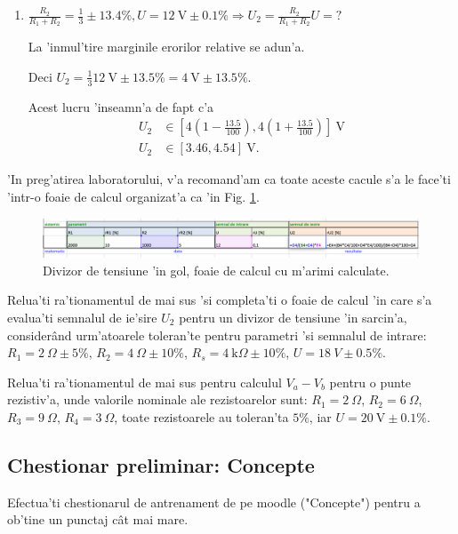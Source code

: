\begin{example}[]
\begin{enumerate}
\item \textcolor{Bittersweet}{$\frac{R_2}{R_1+R_2} = \frac{1}{3} \pm 13.4\%, U=12~\mathrm{V}\pm0.1\% \Longrightarrow U_2 = \frac{R_2}{R_1+R_2}U=?$}

La 'inmul'tire marginile erorilor relative se adun'a.

Deci $U_2 = \frac{1}{3}12~\mathrm{V} \pm 13.5\% = 4~\mathrm{V} \pm 13.5\%$.

Acest lucru 'inseamn'a de fapt c'a 
\begin{align*}
U_2 &\in \left[4\left(1-\frac{13.5}{100}\right), 4\left(1+\frac{13.5}{100}\right)\right]~\mathrm{V} \\
U_2 &\in \left[3.46, 4.54\right]~\mathrm{V}.
\end{align*}
\end{enumerate}
\end{example}

'In preg'atirea laboratorului, v'a recomand'am ca toate aceste cacule s'a le face'ti 'intr-o foaie de calcul organizat'a ca 'in Fig. \ref{fig:divizor_tensiune_excel1}.

\begin{figure}
	\centering
		\includegraphics[width=1\textwidth]{laborator_01/figuri/divizor_tensiune_excel1}
	\caption{Divizor de tensiune 'in gol, foaie de calcul cu m'arimi calculate.}
	 \label{fig:divizor_tensiune_excel1}
\end{figure}

\begin{exercise}
  Relua'ti ra'tionamentul de mai sus 'si completa'ti o foaie de calcul 'in care s'a evalua'ti semnalul de ie'sire $U_2$ pentru un divizor de tensiune 'in sarcin'a, consider\^and urm'atoarele toleran'te pentru parametri 'si semnalul de intrare: $R_1 = 2~\Omega\pm5\%$, $R_2 = 4~\Omega\pm10\%$, $R_s = 4~\mathrm{k}\Omega\pm10\%$, $U = 18~V\pm0.5\%$.
\end{exercise}
\begin{exercise}
  Relua'ti ra'tionamentul de mai sus pentru calculul $V_a-V_b$ pentru o punte rezistiv'a, unde valorile nominale ale rezistoarelor sunt: $R_1 = 2~\Omega$, $R_2 = 6~\Omega$, $R_3 = 9~\Omega$, $R_4 = 3~\Omega$, toate rezistoarele au toleran'ta $5\%$, iar $U = 20~\mathrm{V}\pm0.1\%$.
\end{exercise}

\subsection*{Chestionar preliminar:  Concepte}


\begin{exercise}
Efectua'ti chestionarul de antrenament de pe moodle ("Concepte") pentru a ob'tine un punctaj c\^at mai mare.
\end{exercise}